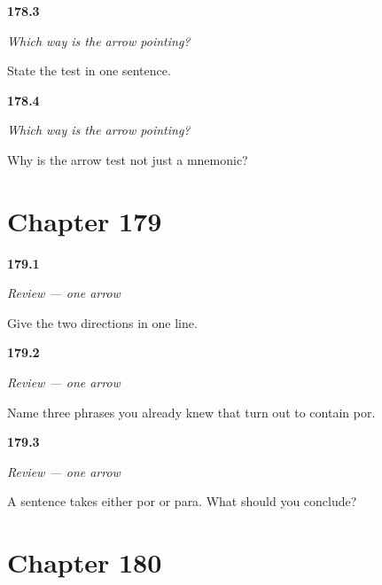 \noindent\begin{minipage}[t]{\linewidth}
\raggedright
\hypertarget{review-ES-C51-la-flecha-test}{\textbf{178.3}} \emph{Which way is the arrow pointing?}\par
\small State the test in one sentence.
\end{minipage}\par\medskip

\noindent\begin{minipage}[t]{\linewidth}
\raggedright
\hypertarget{review-ES-C51-la-flecha-why}{\textbf{178.4}} \emph{Which way is the arrow pointing?}\par
\small Why is the arrow test not just a mnemonic?
\end{minipage}\par\medskip

\section*{Chapter 179}

\noindent\begin{minipage}[t]{\linewidth}
\raggedright
\hypertarget{review-ES-C51-repaso-flecha-two}{\textbf{179.1}} \emph{Review — one arrow}\par
\small Give the two directions in one line.
\end{minipage}\par\medskip

\noindent\begin{minipage}[t]{\linewidth}
\raggedright
\hypertarget{review-ES-C51-repaso-flecha-old}{\textbf{179.2}} \emph{Review — one arrow}\par
\small Name three phrases you already knew that turn out to contain por.
\end{minipage}\par\medskip

\noindent\begin{minipage}[t]{\linewidth}
\raggedright
\hypertarget{review-ES-C51-repaso-flecha-both}{\textbf{179.3}} \emph{Review — one arrow}\par
\small A sentence takes either por or para. What should you conclude?
\end{minipage}\par\medskip

\section*{Chapter 180}

